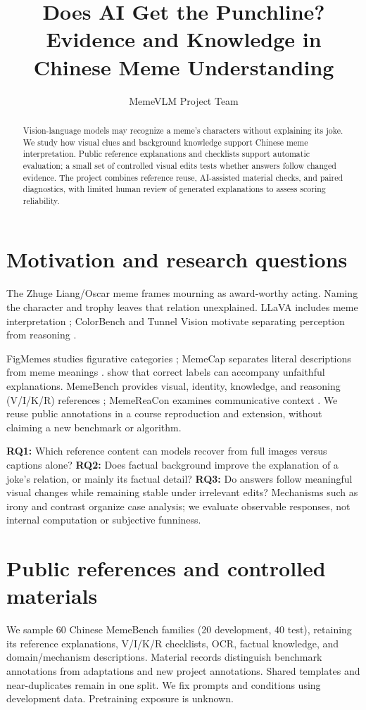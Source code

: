 \documentclass[11pt]{article}
\title{Does AI Get the Punchline?\\
Evidence and Knowledge in Chinese Meme Understanding}
\author{MemeVLM Project Team}
\begin{document}
\raggedbottom
\maketitle
\begin{abstract}
Vision-language models may recognize a meme's characters without explaining its joke. We study how visual clues and background knowledge support Chinese meme interpretation. Public reference explanations and checklists support automatic evaluation; a small set of controlled visual edits tests whether answers follow changed evidence. The project combines reference reuse, AI-assisted material checks, and paired diagnostics, with limited human review of generated explanations to assess scoring reliability.
\end{abstract}

\section{Motivation and research questions}
The Zhuge Liang/Oscar meme frames mourning as award-worthy acting. Naming the character and trophy leaves that relation unexplained. LLaVA includes meme interpretation \citep{liu2023llava}; ColorBench and Tunnel Vision motivate separating perception from reasoning \citep{liang2025color,berman2025tunnel}.

FigMemes studies figurative categories \citep{liu2022figmemes}; MemeCap separates literal descriptions from meme meanings \citep{hwang2023memecap}. \citet{zhou2026came} show that correct labels can accompany unfaithful explanations. MemeBench provides visual, identity, knowledge, and reasoning (V/I/K/R) references \citep{wang2026meme}; MemeReaCon examines communicative context \citep{zhao2025context}. We reuse public annotations in a course reproduction and extension, without claiming a new benchmark or algorithm.

\noindent\textbf{RQ1:} Which reference content can models recover from full images versus captions alone? \textbf{RQ2:} Does factual background improve the explanation of a joke's relation, or mainly its factual detail? \textbf{RQ3:} Do answers follow meaningful visual changes while remaining stable under irrelevant edits? Mechanisms such as irony and contrast organize case analysis; we evaluate observable responses, not internal computation or subjective funniness.

\section{Public references and controlled materials}
We sample 60 Chinese MemeBench families (20 development, 40 test), retaining its reference explanations, V/I/K/R checklists, OCR, factual knowledge, and domain/mechanism descriptions. Material records distinguish benchmark annotations from adaptations and new project annotations. Shared templates and near-duplicates remain in one split. We fix prompts and conditions using development data. Pretraining exposure is unknown.
\end{document}
